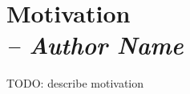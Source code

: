 \chapter{Motivation \\
  \small{\textit{-- Author Name}}
  \label{Chapter::Motivation}}


TODO: describe motivation
